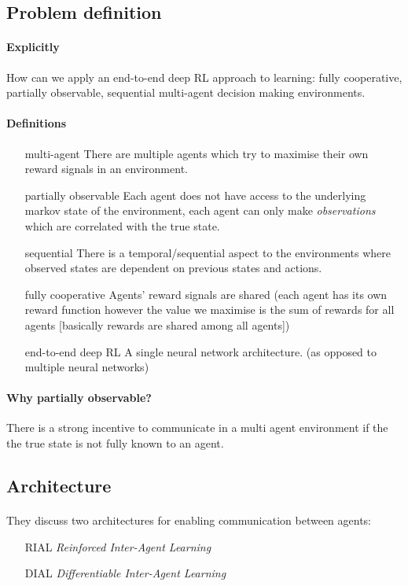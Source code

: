\documentclass{article}
\begin{document}
    \subsection{Problem definition}

    \paragraph{Explicitly} 
    How can we apply an end-to-end deep RL approach to learning:
    fully cooperative, partially observable, sequential multi-agent decision making environments.
    \paragraph{Definitions}
    \begin{enumerate}
        \item[multi-agent] There are multiple agents which try to maximise their own reward signals in an environment.
        \item[partially observable] Each agent does not have access to the underlying markov state of the environment, each agent can only make \emph{observations} which are correlated with the true state.
        \item[sequential] There is a temporal/sequential aspect to the environments where observed states are dependent on previous states and actions.
        \item[fully cooperative] Agents' reward signals are shared (each agent has its own reward function however the value we maximise is the sum of rewards for all agents [basically rewards are shared among all agents])
        \item[end-to-end deep RL] A single neural network architecture. (as opposed to multiple neural networks)
    \end{enumerate}
        
    \paragraph{Why partially observable?} There is a strong incentive to communicate in a multi agent environment if the the true state is not fully known to an agent.

    \subsection{Architecture}

    \paragraph{} They discuss two architectures for enabling communication between agents:
    \begin{enumerate}
        \item[RIAL] \emph{Reinforced Inter-Agent Learning}
        \item[DIAL] \emph{Differentiable Inter-Agent Learning}
    \end{enumerate}
\end{document}
